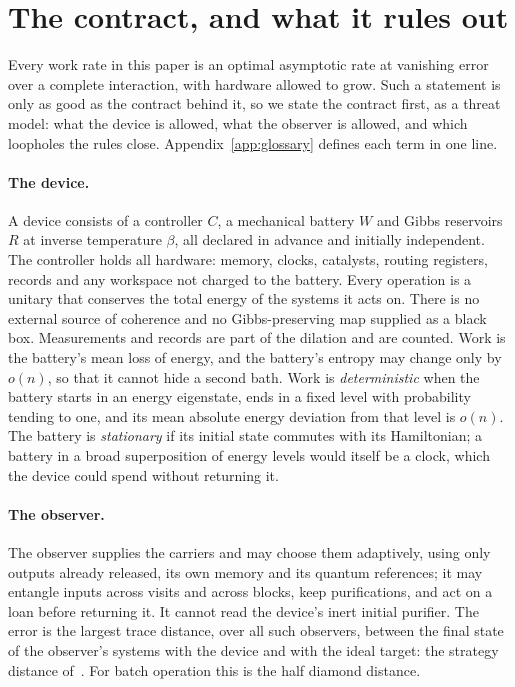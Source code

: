 \section{The contract, and what it rules out}\label{sec:contract}

Every work rate in this paper is an optimal asymptotic rate at vanishing error over a complete interaction, with hardware allowed to grow. Such a statement is only as good as the contract behind it, so we state the contract first, as a threat model: what the device is allowed, what the observer is allowed, and which loopholes the rules close. Appendix~\ref{app:glossary} defines each term in one line.

\paragraph{The device.} A device consists of a controller $C$, a mechanical battery $W$ and Gibbs reservoirs $R$ at inverse temperature $\beta$, all declared in advance and initially independent. The controller holds all hardware: memory, clocks, catalysts, routing registers, records and any workspace not charged to the battery. Every operation is a unitary that conserves the total energy of the systems it acts on. There is no external source of coherence and no Gibbs-preserving map supplied as a black box. Measurements and records are part of the dilation and are counted. Work is the battery's mean loss of energy, and the battery's entropy may change only by $o(n)$, so that it cannot hide a second bath. Work is \emph{deterministic} when the battery starts in an energy eigenstate, ends in a fixed level with probability tending to one, and its mean absolute energy deviation from that level is $o(n)$. The battery is \emph{stationary} if its initial state commutes with its Hamiltonian; a battery in a broad superposition of energy levels would itself be a clock, which the device could spend without returning it.

\paragraph{The observer.} The observer supplies the carriers and may choose them adaptively, using only outputs already released, its own memory and its quantum references; it may entangle inputs across visits and across blocks, keep purifications, and act on a loan before returning it. It cannot read the device's inert initial purifier. The error is the largest trace distance, over all such observers, between the final state of the observer's systems with the device and with the ideal target: the strategy distance of~\cite{Chiribella08,GutoskiWatrous07}. For batch operation this is the half diamond distance.

